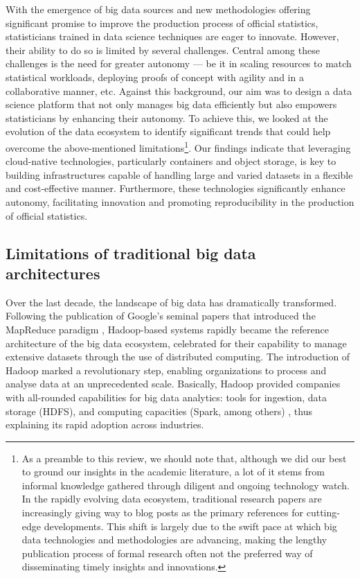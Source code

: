 \documentclass[graybox]{svmult}
\begin{document}
With the emergence of big data sources and new methodologies offering significant promise to improve the production process of official statistics, statisticians trained in data science techniques are eager to innovate. However, their ability to do so is limited by several challenges. Central among these challenges is the need for greater autonomy — be it in scaling resources to match statistical workloads, deploying proofs of concept with agility and in a collaborative manner, etc. Against this background, our aim was to design a data science platform that not only manages big data efficiently but also empowers statisticians by enhancing their autonomy. To achieve this, we looked at the evolution of the data ecosystem to identify significant trends that could help overcome the above-mentioned limitations\footnote{As a preamble to this review, we should note that, although we did our best to ground our insights in the academic literature, a lot of it stems from informal knowledge  gathered through diligent and ongoing technology watch. In the rapidly evolving data ecosystem, traditional research papers are increasingly giving way to blog posts as the primary references for cutting-edge developments. This shift is largely due to the swift pace at which big data technologies and methodologies are advancing, making the lengthy publication process of formal research often not the preferred way of disseminating timely insights and innovations.}. Our findings indicate that leveraging cloud-native technologies, particularly containers and object storage, is key to building infrastructures capable of handling large and varied datasets in a flexible and cost-effective manner. Furthermore, these technologies significantly enhance autonomy, facilitating innovation and promoting reproducibility in the production of official statistics.

\subsection{Limitations of traditional big data architectures}

Over the last decade, the landscape of big data has dramatically transformed. Following the publication of Google's seminal papers that introduced the MapReduce paradigm \cite{ghemawat2003google, dean2008mapreduce}, Hadoop-based systems rapidly became the reference architecture of the big data ecosystem, celebrated for their capability to manage extensive datasets through the use of distributed computing. The introduction of Hadoop marked a revolutionary step, enabling organizations to process and analyse data at an unprecedented scale. Basically, Hadoop provided companies with all-rounded capabilities for big data analytics: tools for ingestion, data storage (HDFS), and computing capacities (Spark, among others) \cite{dhyani2014big}, thus explaining its rapid adoption across industries.
\end{document}
